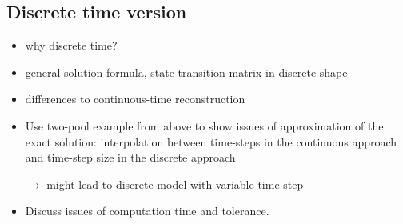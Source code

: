 \documentclass[11pt,a4paper]{article}
\begin{document}
\subsection*{Discrete time version}
    \begin{itemize}
        \item why discrete time?
        \item general solution formula, state transition matrix in discrete shape
        \item differences to continuous-time reconstruction
        \item Use two-pool example from above to show issues of approximation of the exact solution: interpolation between time-steps in the continuous approach and time-step size in the discrete approach
        \item[$\to$] might lead to discrete model with variable time step
        \item Discuss issues of computation time and tolerance.
    \end{itemize}
    
\end{document}
